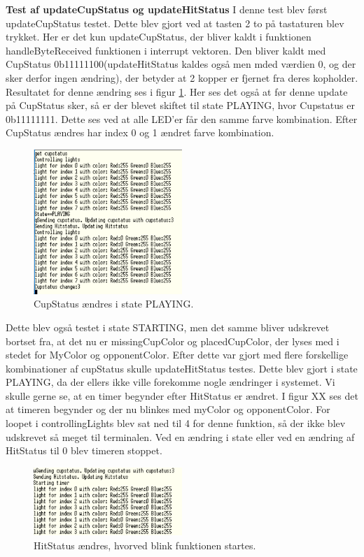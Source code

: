 \documentclass[Modultest/Modultest_main.tex]{subfiles}
\begin{document}
\textbf{Test af updateCupStatus og updateHitStatus}
I denne test blev først updateCupStatus testet. Dette blev gjort ved at tasten 2 to på tastaturen blev trykket. Her er det kun updateCupStatus, der bliver kaldt i funktionen handleByteReceived funktionen i interrupt vektoren. Den bliver kaldt med CupStatus 0b11111100(updateHitStatus kaldes også men mded værdien 0, og der sker derfor ingen ændring), der betyder at 2 kopper er fjernet fra deres kopholder. Resultatet for denne ændring ses i figur \ref{fig:cupstatus_change}. Her ses det også at før denne update på CupStatus sker, så er der blevet skiftet til state PLAYING, hvor Cupstatus er 0b11111111. Dette ses ved at alle LED'er får den samme farve kombination. Efter CupStatus ændres har index 0 og 1 ændret farve kombination.
\begin{figure}[H]
    \centering
    \includegraphics[width=0.5\textwidth]{Modultest/playerside_GameController/graphics/PLAYING_cupstatus_change.PNG}
    \caption{CupStatus ændres i state PLAYING.}
    \label{fig:cupstatus_change}
\end{figure}
Dette blev også testet i state STARTING, men det samme bliver udskrevet bortset fra, at det nu er missingCupColor og placedCupColor, der lyses med i stedet for MyColor og opponentColor. 
Efter dette var gjort med flere forskellige kombinationer af cupStatus skulle updateHitStatus testes. Dette blev gjort i state PLAYING, da der ellers ikke ville forekomme nogle ændringer i systemet. Vi skulle gerne se, at en timer begynder efter HitStatus er ændret. I figur XX ses det at timeren begynder og der nu blinkes med myColor og opponentColor. For loopet i controllingLights blev sat ned til 4 for denne funktion, så der ikke blev udskrevet så meget til terminalen. Ved en ændring i state eller ved en ændring af HitStatus til 0 blev timeren stoppet.
\begin{figure}[H]
    \centering
    \includegraphics[width=0.5\textwidth]{Modultest/playerside_GameController/graphics/HIT_timer.PNG}
    \caption{HitStatus ændres, hvorved blink funktionen startes.}
    \label{fig:HitStatus_change}
\end{figure}
\end{document}

